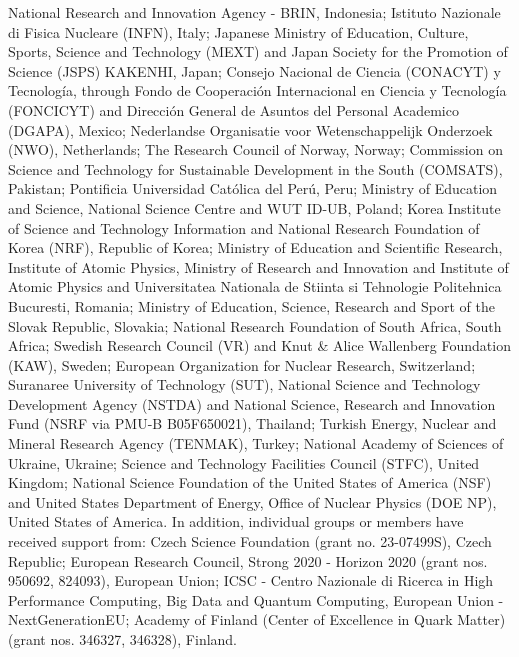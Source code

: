 %
National Research and Innovation Agency - BRIN, Indonesia;
%
Istituto Nazionale di Fisica Nucleare (INFN), Italy;
%
Japanese Ministry of Education, Culture, Sports, Science and Technology (MEXT) and Japan Society for the Promotion of Science (JSPS) KAKENHI, Japan;
%
Consejo Nacional de Ciencia (CONACYT) y Tecnolog\'{i}a, through Fondo de Cooperaci\'{o}n Internacional en Ciencia y Tecnolog\'{i}a (FONCICYT) and Direcci\'{o}n General de Asuntos del Personal Academico (DGAPA), Mexico;
%
Nederlandse Organisatie voor Wetenschappelijk Onderzoek (NWO), Netherlands;
%
The Research Council of Norway, Norway;
%
Commission on Science and Technology for Sustainable Development in the South (COMSATS), Pakistan;
%
Pontificia Universidad Cat\'{o}lica del Per\'{u}, Peru;
%
Ministry of Education and Science, National Science Centre and WUT ID-UB, Poland;
%
Korea Institute of Science and Technology Information and National Research Foundation of Korea (NRF), Republic of Korea;
%
Ministry of Education and Scientific Research, Institute of Atomic Physics, Ministry of Research and Innovation and Institute of Atomic Physics and Universitatea Nationala de Stiinta si Tehnologie Politehnica Bucuresti, Romania;
%
Ministry of Education, Science, Research and Sport of the Slovak Republic, Slovakia;
%
National Research Foundation of South Africa, South Africa;
%
Swedish Research Council (VR) and Knut \& Alice Wallenberg Foundation (KAW), Sweden;
%
European Organization for Nuclear Research, Switzerland;
%
Suranaree University of Technology (SUT), National Science and Technology Development Agency (NSTDA) and National Science, Research and Innovation Fund (NSRF via PMU-B B05F650021), Thailand;
%
Turkish Energy, Nuclear and Mineral Research Agency (TENMAK), Turkey;
%
National Academy of  Sciences of Ukraine, Ukraine;
%
Science and Technology Facilities Council (STFC), United Kingdom;
%
National Science Foundation of the United States of America (NSF) and United States Department of Energy, Office of Nuclear Physics (DOE NP), United States of America.
%
In addition, individual groups or members have received support from:
%
Czech Science Foundation (grant no. 23-07499S), Czech Republic;
%
European Research Council, Strong 2020 - Horizon 2020 (grant nos. 950692, 824093), European Union;
%
ICSC - Centro Nazionale di Ricerca in High Performance Computing, Big Data and Quantum Computing, European Union - NextGenerationEU;
%
Academy of Finland (Center of Excellence in Quark Matter) (grant nos. 346327, 346328), Finland.
